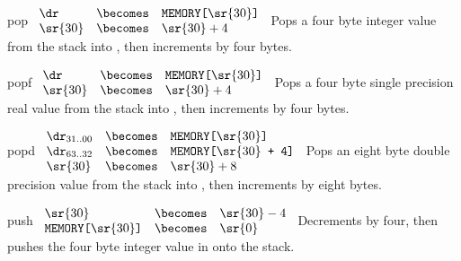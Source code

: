 \begin{instruction}{pop}\label{inst:pop}
     {\popopc}
     {
       \begin{math}
         \begin{array}{lcl}
           \dr & \becomes & \texttt{MEMORY[\textrm{\sr{30}}]} \\
           \sr{30} & \becomes & \sr{30} + 4 \\
         \end{array}
       \end{math}
     }
     {
       Pops a four byte integer value from the stack into \dr, then
       increments  by four bytes.
     }
\end{instruction}

\begin{instruction}{popf}\label{inst:popf}
     {\popfopc}
     {
       \begin{math}
         \begin{array}{lcl}
           \dr & \becomes & \texttt{MEMORY[\textrm{\sr{30}}]} \\
           \sr{30} & \becomes & \sr{30} + 4 \\
         \end{array}
       \end{math}
     }
     {
       Pops a four byte single precision real value from the stack
       into \dr, then increments  by four bytes.
     }
\end{instruction}

\begin{instruction}{popd}\label{inst:popd}
     {\popdopc}
     {
       \begin{math}
         \begin{array}{lcl}
           {\dr}_{31..00} & \becomes & \texttt{MEMORY[\textrm{\sr{30}}]} \\
           {\dr}_{63..32} & \becomes & \texttt{MEMORY[\textrm{\sr{30}} + 4]} \\
           \sr{30}       & \becomes & \sr{30} + 8 \\
         \end{array}
       \end{math}
     }
     {
       Pops an eight byte double precision  value from the stack
       into \dr, then increments  by eight bytes.
     }
\end{instruction}

\begin{instruction}{push}\label{inst:push}
     {\pushopc}
     {
       \begin{math}
         \begin{array}{lcl}
           \sr{30}                           & \becomes & \sr{30} - 4 \\
           \texttt{MEMORY[\textrm{\sr{30}}]} & \becomes & {\sr{0}} \\
         \end{array}
       \end{math}
     }
     {
       Decrements  by four, then pushes the four byte integer
       value in  onto the stack.
     }
\end{instruction}


